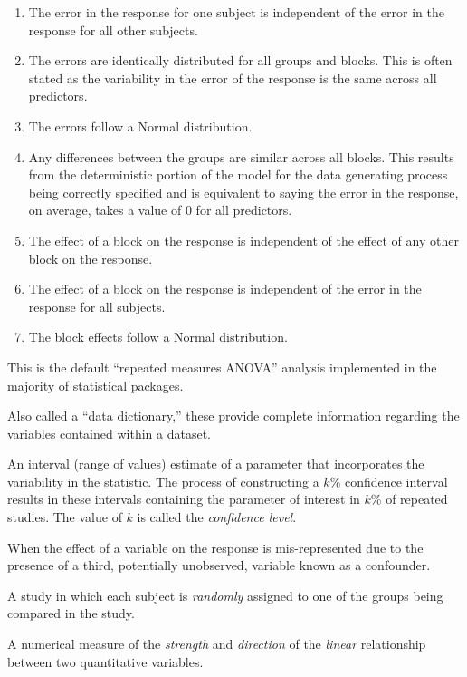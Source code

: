 \documentclass[
  letterpaper,
  DIV=11,
  numbers=noendperiod]{scrreprt}
\providecommand{\tightlist}{%
  \setlength{\itemsep}{0pt}\setlength{\parskip}{0pt}}\usepackage{longtable,booktabs,array}
\theoremstyle{plain}
\theoremstyle{definition}
\theoremstyle{definition}
\theoremstyle{remark}
\begin{document}
\begin{enumerate}
\def\labelenumi{\arabic{enumi}.}
\tightlist
\item
  The error in the response for one subject is independent of the error
  in the response for all other subjects.
\item
  The errors are identically distributed for all groups and blocks. This
  is often stated as the variability in the error of the response is the
  same across all predictors.
\item
  The errors follow a Normal distribution.
\item
  Any differences between the groups are similar across all blocks. This
  results from the deterministic portion of the model for the data
  generating process being correctly specified and is equivalent to
  saying the error in the response, on average, takes a value of 0 for
  all predictors.
\item
  The effect of a block on the response is independent of the effect of
  any other block on the response.
\item
  The effect of a block on the response is independent of the error in
  the response for all subjects.
\item
  The block effects follow a Normal distribution.
\end{enumerate}

This is the default ``repeated measures ANOVA'' analysis implemented in
the majority of statistical packages.

\begin{description}
\tightlist
\item[Codebook (Definition~\ref{def-codebook})]
Also called a ``data dictionary,'' these provide complete information
regarding the variables contained within a dataset.
\item[Confidence Interval (Definition~\ref{def-confidence-interval})]
An interval (range of values) estimate of a parameter that incorporates
the variability in the statistic. The process of constructing a \(k\)\%
confidence interval results in these intervals containing the parameter
of interest in \(k\)\% of repeated studies. The value of \(k\) is called
the \emph{confidence level}.
\item[Confounding (Definition~\ref{def-confounding})]
When the effect of a variable on the response is mis-represented due to
the presence of a third, potentially unobserved, variable known as a
confounder.
\item[Controlled Experiment
(Definition~\ref{def-controlled-experiment})]
A study in which each subject is \emph{randomly} assigned to one of the
groups being compared in the study.
\item[Correlation Coefficient
(Definition~\ref{def-correlation-coefficient})]
A numerical measure of the \emph{strength} and \emph{direction} of the
\emph{linear} relationship between two quantitative variables.
\end{description}
\end{document}
